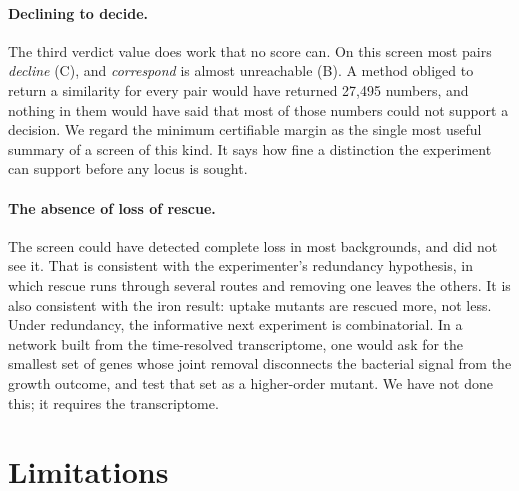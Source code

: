 \documentclass[10pt,twocolumn,a4paper]{article}
\theoremstyle{definition}
\theoremstyle{remark}
\begin{document}
\paragraph{Declining to decide.} The third verdict value does work that
no score can. On this screen most pairs \emph{decline}
(C), and \emph{correspond} is almost unreachable
(B). A method obliged to return a similarity for every
pair would have returned 27,495 numbers, and nothing in them would have
said that most of those numbers could not support a decision. We regard
the minimum certifiable margin as the single most useful summary of a
screen of this kind. It says how fine a distinction the experiment can
support before any locus is sought.

\paragraph{The absence of loss of rescue.} The screen could have
detected complete loss in most backgrounds, and did not see it. That is
consistent with the experimenter's redundancy hypothesis, in which rescue
runs through several routes and removing one leaves the others. It is
also consistent with the iron result: uptake mutants are rescued more,
not less. Under redundancy, the informative next experiment is
combinatorial. In a network built from the time-resolved transcriptome,
one would ask for the smallest set of genes whose joint removal
disconnects the bacterial signal from the growth outcome, and test that
set as a higher-order mutant. We have not done this; it requires the
transcriptome.

\section{Limitations}
\label{sec:limits}
\end{document}
